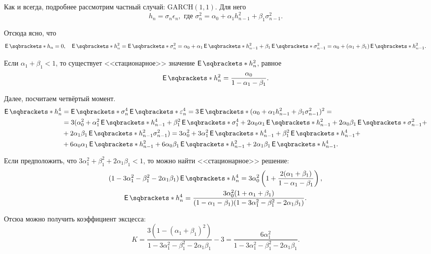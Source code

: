 Как и всегда, подробнее рассмотрим частный случай: \(\mathrm{GARCH}(1, 1)\). 
Для него
\[
	h_{n} = \sigma_{n}\epsilon_{n}, \text{ где } \sigma_{n}^{2} = \alpha_{0} + 
	\alpha_{1}h_{n - 1}^{2} + \beta_{1}\sigma_{n - 1}^{2}.
\]

Отсюда ясно, что
\[
	\E{h_{n}} = 0, \quad \E{h_{n}^{2}} = \E{\sigma_{n}^{2}} = \alpha_{0} + 
	\alpha_{1}\E{h_{n - 1}^{2}} + \beta_{1}\E{\sigma_{n - 1}^{2}} = \alpha_{0} 
	+ (\alpha_{1} + \beta_{1})\E{h_{n - 1}^{2}}.
\]

Если \(\alpha_{1} + \beta_{1} < 1\), то существует <<стационарное>> значение 
\(\E{h_{n}^{2}}\), равное
\[
	\E{h_{n}^{2}} = \frac{\alpha_{0}}{1 - \alpha_{1} - \beta_{1}}.
\]

Далее, посчитаем четвёртый момент.
\begin{align*}
	\E{h_{n}^{4}} &= \E{\sigma_{n}^{4}}\E{\epsilon_{n}^{4}} = 3\E{(\alpha_{0} 
	+ \alpha_{1}h_{n - 1}^{2} + \beta_{1}\sigma_{n - 1}^{2})^{2}} = \\
	&= 3(\alpha_{0}^{2} + \alpha_{1}^{2}\E{h_{n - 1}^{4}} + 
	\beta_{1}^{2}\E{\sigma_{1}^{4}} + 2\alpha_{0}\alpha_{1}\E{h_{n - 1}^{2}} + 
	2\alpha_{0}\beta_{1}\E{\sigma_{n - 1}^{2}} + \\
	&+ 2\alpha_{1}\beta_{1}\E{h_{n - 1}^{2}\sigma_{n - 1}^{2}}) = 
	3\alpha_{0}^{2} + 3\alpha_{1}^{2}\E{h_{n - 1}^{4}} + \beta_{1}^{2}\E{h_{n - 
	1}^{4}} + \\
	&+ 6\alpha_{0}\alpha_{1}\E{h_{n - 1}^{2}} + 6\alpha_{0}\beta_{1}\E{h_{n - 
	1}^{2}} + 2\alpha_{1}\beta_{1}\E{h_{n - 1}^{4}}.
\end{align*}

Если предположить, что \(3\alpha_{1}^{2} + \beta_{1}^{2} + 2\alpha_{1}\beta_{1} 
< 1\), то можно найти <<стационарное>> решение:
\begin{gather*}
	(1 - 3\alpha_{1}^{2} - \beta_{1}^{2} - 2\alpha_{1}\beta_{1})\E{h_{n}^{4}} = 
	3\alpha_{0}^{2}\left(1 + \frac{2(\alpha_{1} + \beta_{1})}{1 - \alpha_{1} - 
		\beta_{1}}\right), \\
	\E{h_{n}^{4}} = \frac{3\alpha_{0}^{2}(1 + \alpha_{1} + \beta_{1})}{(1 - 
	\alpha_{1} - \beta_{1})(1 - 3\alpha_{1}^{2} - \beta_{1}^{2} - 
	2\alpha_{1}\beta_{1})}.
\end{gather*}

Отсюа можно получить коэффициент эксцесса:
\[
	K = \frac{3(1 - (\alpha_{1} + \beta_{1})^{2})}{1 - 3\alpha_{1}^{2} - 
	\beta_{1}^{2} - 2\alpha_{1}\beta_{1}} - 3 = \frac{6\alpha_{1}^{2}}{1 - 
	3\alpha_{1}^{2} - \beta_{1}^{2} - 2\alpha_{1}\beta_{1}}.
\]

